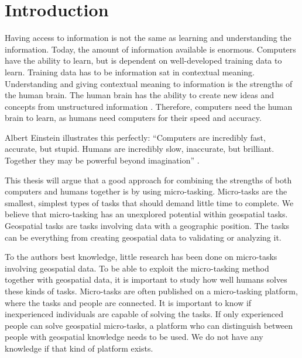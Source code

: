 \chapter{Introduction}
Having access to information is not the same as learning and understanding the information. Today, the amount of information available is enormous. Computers have the ability to learn, but is dependent on well-developed training data to learn. Training data has to be information sat in contextual meaning. Understanding and giving contextual meaning to information is the strengths of the human brain. The human brain has the ability to create new ideas and concepts from unstructured information \citep{Ross2016}. Therefore, computers need the human brain to learn, as humans need computers for their speed and accuracy.  

Albert Einstein illustrates this perfectly: “Computers are incredibly fast, accurate, but stupid. Humans are incredibly slow, inaccurate, but brilliant. Together they may be powerful beyond imagination” \citep{Holzinger2013}. 

This thesis will argue that a good approach for combining the strengths of both computers and humans together is by using micro-tasking. Micro-tasks are the smallest, simplest types of tasks that should demand little time to complete. We believe that micro-tasking has an unexplored potential within geospatial tasks. Geospatial tasks are tasks involving data with a geographic position. The tasks can be everything from creating geospatial data to validating or analyzing it. 

To the authors best knowledge, little research has been done on micro-tasks involving geospatial data. To be able to exploit the micro-tasking method together with geospatial data, it is important to study how well humans solves these kinds of tasks. Micro-tasks are often published on a micro-tasking platform, where the tasks and people are connected. It is important to know if inexperienced individuals are capable of solving the tasks. If only experienced people can solve geospatial micro-tasks, a platform who can distinguish between people with geospatial knowledge needs to be used. We do not have any knowledge if that kind of platform exists. 

